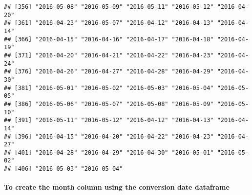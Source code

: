 \documentclass[
]{article}
\newenvironment{Shaded}{\begin{snugshade}}{\end{snugshade}}
\newcommand{\FunctionTok}[1]{\textcolor[rgb]{0.00,0.00,0.00}{#1}}
\newcommand{\NormalTok}[1]{#1}
\newcommand{\OtherTok}[1]{\textcolor[rgb]{0.56,0.35,0.01}{#1}}
\newcommand{\SpecialCharTok}[1]{\textcolor[rgb]{0.00,0.00,0.00}{#1}}
\newcommand{\StringTok}[1]{\textcolor[rgb]{0.31,0.60,0.02}{#1}}
\begin{document}
\begin{verbatim}
## [356] "2016-05-08" "2016-05-09" "2016-05-11" "2016-05-12" "2016-04-20"
## [361] "2016-04-23" "2016-05-07" "2016-04-12" "2016-04-13" "2016-04-14"
## [366] "2016-04-15" "2016-04-16" "2016-04-17" "2016-04-18" "2016-04-19"
## [371] "2016-04-20" "2016-04-21" "2016-04-22" "2016-04-23" "2016-04-24"
## [376] "2016-04-26" "2016-04-27" "2016-04-28" "2016-04-29" "2016-04-30"
## [381] "2016-05-01" "2016-05-02" "2016-05-03" "2016-05-04" "2016-05-05"
## [386] "2016-05-06" "2016-05-07" "2016-05-08" "2016-05-09" "2016-05-10"
## [391] "2016-05-11" "2016-05-12" "2016-04-12" "2016-04-13" "2016-04-14"
## [396] "2016-04-15" "2016-04-20" "2016-04-22" "2016-04-23" "2016-04-27"
## [401] "2016-04-28" "2016-04-29" "2016-04-30" "2016-05-01" "2016-05-02"
## [406] "2016-05-03" "2016-05-04"
\end{verbatim}

\hypertarget{to-create-the-month-column-using-the-conversion-date-dataframe-1}{%
\paragraph{To create the month column using the conversion date
dataframe}\label{to-create-the-month-column-using-the-conversion-date-dataframe-1}}

\begin{Shaded}
\end{Shaded}
\end{document}
